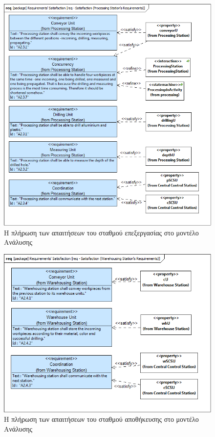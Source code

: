 \documentclass[a4paper,12pt,twoside]{report}
\begin{document}
\begin{appendices}
			\begin{figure}[hp]
					\centering
					\includegraphics[scale=0.30]{AnalysisModel_req-Satisfaction(ProcessingStationsRequirements).png}
					\caption{Η πλήρωση των απαιτήσεων του σταθμού επεξεργασίας στο μοντέλο Ανάλυσης}
					\label{φωτ:Η πλήρωση των απαιτήσεων του σταθμού επεξεργασίας στο μοντέλο Ανάλυσης}
			\end{figure}
			
			\begin{figure}[hp]
					\centering
					\includegraphics[scale=0.30]{AnalysisModel_req-Satisfaction(WarehousingStationsRequirements).png}
					\caption{Η πλήρωση των απαιτήσεων του σταθμού αποθήκευσης στο μοντέλο Ανάλυσης}
					\label{φωτ:Η πλήρωση των απαιτήσεων του σταθμού αποθήκευσης στο μοντέλο Ανάλυσης}
			\end{figure}
			

\end{appendices}
\end{document}
